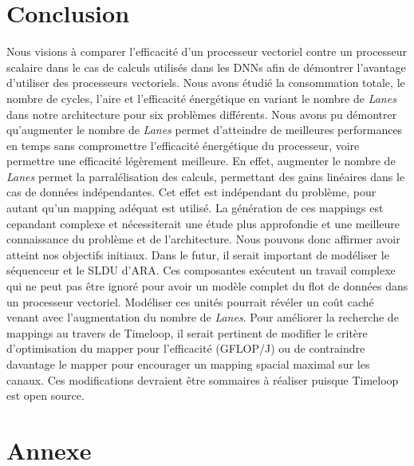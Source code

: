 \documentclass[10pt,letterpaper]{article}
\begin{document}
\section{Conclusion}
\begin{multicols}{2}

    Nous visions à comparer l'efficacité d'un processeur vectoriel contre un processeur 
    scalaire dans le cas de calculs utilisés dans les DNNs afin de démontrer l'avantage 
    d'utiliser des processeurs vectoriels. Nous avons étudié la consommation totale, le 
    nombre de cycles, l'aire et l'efficacité énergétique en variant le nombre de \textit{Lanes} 
    dans notre architecture pour six problèmes différents. Nous avons pu démontrer 
    qu'augmenter le nombre de \textit{Lanes} permet d'atteindre de meilleures performances 
    en temps sans compromettre l'efficacité énergétique du processeur, voire permettre une 
    efficacité légèrement meilleure. En effet, augmenter le nombre de \textit{Lanes} permet 
    la parralélisation des calculs, permettant des gains linéaires dans le cas de données 
    indépendantes. Cet effet est indépendant du problème, pour autant qu'un mapping adéquat 
    est utilisé. La génération de ces mappings est cepandant complexe et nécessiterait une 
    étude plus approfondie et une meilleure connaissance du problème et de l'architecture.
    Nous pouvons donc affirmer avoir atteint nos objectifs initiaux.
    \newline
    Dans le futur, il serait important de modéliser le séquenceur et le SLDU d'ARA. Ces 
    composantes exécutent un travail complexe qui ne peut pas être ignoré pour avoir un 
    modèle complet du flot de données dans un processeur vectoriel. Modéliser ces unités 
    pourrait révéler un coût caché venant avec l'augmentation du nombre de \textit{Lanes}.
    Pour améliorer la recherche de mappings au travers de Timeloop, il serait pertinent 
    de modifier le critère d'optimisation du mapper pour l'efficacité (GFLOP/J) ou de contraindre
    davantage le mapper pour encourager un mapping spacial maximal sur les canaux. Ces 
    modifications devraient être sommaires à réaliser puisque Timeloop est open source.
    
    \end{multicols}

{}
    

\pagebreak
\section*{Annexe}
\end{document}

